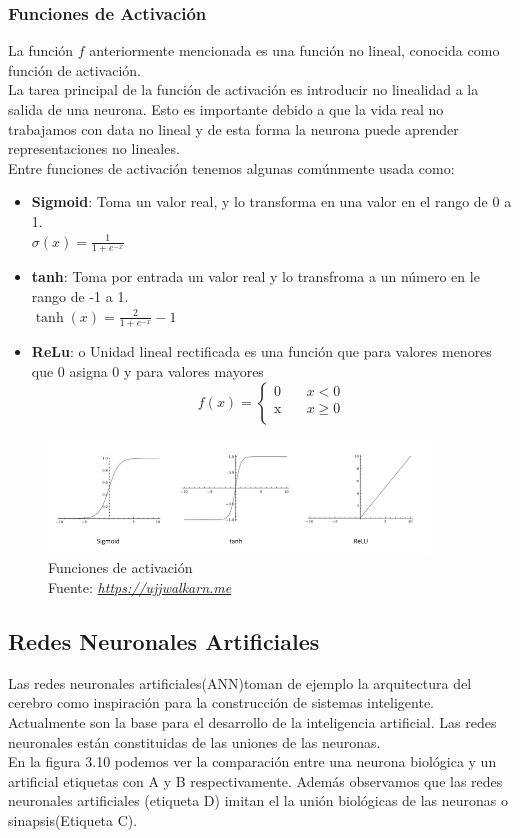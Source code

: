\subsubsection{Funciones de Activación}
La función $f$ anteriormente mencionada es una función no lineal, conocida como función de activación.\\ La tarea principal de la función de activación es introducir no linealidad a la salida de una neurona. Esto es importante debido a que la vida real no trabajamos con data no lineal y de esta forma la neurona puede aprender representaciones no lineales.\\ Entre funciones de activación tenemos algunas comúnmente usada como:
\begin{itemize}
	\item \textbf{Sigmoid}: Toma un valor real, y lo transforma en una valor en el rango de 0 a 1.\\
	$ \sigma (x) = \frac{1}{1+e^{-x}}$
	\item \textbf{tanh}: Toma por entrada un valor real y lo transfroma a un número en le rango de -1 a 1.\\
	$\tanh (x)=\frac{2}{1+e^{-x}} -1$
	\item \textbf{ReLu}: o Unidad lineal rectificada es una función que para valores menores que 0 asigna 0 y para valores mayores 
	\[   
	f(x) = 
	\begin{cases}
	\text{0} &\quad x<0\\
	\text{x} &\quad x\geq0\\

	\end{cases}
	\]
\end{itemize}
\begin{figure}[H]
	\centering
	\includegraphics[width=0.9\textwidth]{Figures/factivacion.png}
	\caption{Funciones de activación \\ Fuente:  \href{https://ujjwalkarn.me/2016/08/09/quick-intro-neural-networks/}{\textit{https://ujjwalkarn.me}}}
	\label{activacion}
\end{figure} 

\subsection{Redes Neuronales Artificiales}
Las redes neuronales artificiales(ANN)toman de ejemplo la arquitectura del cerebro como inspiración para la construcción de sistemas inteligente. Actualmente son la base para el desarrollo de la inteligencia artificial. Las redes neuronales están constituidas de las uniones de las neuronas.\\
En la figura 3.10 podemos ver la comparación entre una neurona biológica y un artificial etiquetas con A y B respectivamente. Además observamos que las redes neuronales artificiales (etiqueta D) imitan el la unión biológicas de las neuronas o sinapsis(Etiqueta C).

